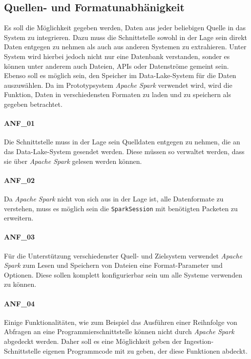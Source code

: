 \subsection{Quellen- und Formatunabhänigkeit}
Es soll die Möglichkeit gegeben werden, Daten aus jeder beliebigen Quelle in das System zu integrieren.
Dazu muss die Schnittstelle sowohl in der Lage sein direkt Daten entgegen zu nehmen als auch aus anderen Systemen zu extrahieren.
Unter System wird hierbei jedoch nicht nur eine Datenbank verstanden, sonder es können unter anderem auch Dateien, APIs oder Datenströme gemeint sein.
Ebenso soll es möglich sein, den Speicher im Data-Lake-System für die Daten auszuwählen.
Da im Prototypsystem \textit{Apache Spark} verwendet wird, wird die Funktion, Daten in verschiedensten Formaten zu laden und zu speichern als gegeben betrachtet.

\paragraph{ANF\_01}
\label{ANF_01}
Die Schnittstelle muss in der Lage sein Quelldaten entgegen zu nehmen, die an das Data-Lake-System gesendet werden.
Diese müssen so verwaltet werden, dass sie über \textit{Apache Spark} gelesen werden können.

\paragraph{ANF\_02}
\label{ANF_02}
Da \textit{Apache Spark} nicht von sich aus in der Lage ist, alle Datenformate zu verstehen, muss es möglich sein die \verb|SparkSession| mit benötigten Packeten zu erweitern.

\paragraph{ANF\_03}
\label{ANF_03}
Für die Unterstützung verschiedenster Quell- und Zielsystem verwendet \textit{Apache Spark} zum Lesen und Speichern von Dateien eine Format-Parameter und Optionen.
Diese sollen komplett konfigurierbar sein um alle Systeme verwenden zu können.

\paragraph{ANF\_04}
\label{ANF_04}
Einige Funktionalitäten, wie zum Beispiel das Ausführen einer Reihnfolge von Abfragen an eine Programmierschnittstelle können nicht durch \textit{Apache Spark} abgedeckt werden.
Daher soll es eine Möglichkeit geben der Ingestion-Schnittstelle eigenen Programmcode mit zu geben, der diese Funktionen abdeckt.

